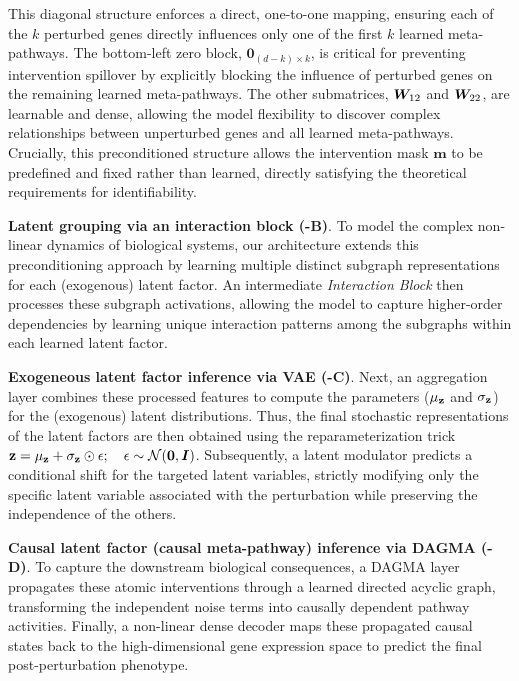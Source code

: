\documentclass[10pt,letterpaper]{article}
\def\vzero{{\bm{0}}}\def\vone{{\bm{1}}}
\def\vm{{\bm{m}}}\def\vn{{\bm{n}}}\def\vo{{\bm{o}}}
\theoremstyle{definition}
\theoremstyle{remark}
\newcommand{\vect}[1]{\mathbf{\MakeLowercase{#1}}}
\newcommand{\latentvars}{\rvz}
\newcommand{\weightmatrix}{\mW}
\newcommand{\identitymatrix}{\mI}
\newcommand{\latentdim}{d}
\newcommand{\numperturbedgenes}{k}
\newcommand{\maskvector}{\vm}
\newcommand{\normaldist}{\gN}
\begin{document}
This diagonal structure enforces a direct, one-to-one mapping, ensuring each of the $\numperturbedgenes$ perturbed genes directly influences only one of the first $\numperturbedgenes$ learned meta-pathways.
The bottom-left zero block, $\vzero_{(\latentdim-\numperturbedgenes) \times \numperturbedgenes}$, is critical for preventing intervention spillover by explicitly blocking the influence of perturbed genes on the remaining learned meta-pathways.
The other submatrices, $\weightmatrix_{12}$ and $\weightmatrix_{22}$, are learnable and dense, allowing the model flexibility to discover complex relationships between unperturbed genes and all learned meta-pathways.
Crucially, this preconditioned structure allows the intervention mask $\maskvector$ to be predefined and fixed rather than learned, directly satisfying the theoretical requirements for identifiability.

\textbf{Latent grouping via an interaction block (-B)}. To model the complex non-linear dynamics of biological systems, our architecture extends this preconditioning approach by learning multiple distinct subgraph representations for each (exogenous) latent factor.
An intermediate \emph{Interaction Block} then processes these subgraph activations, allowing the model to capture higher-order dependencies by learning unique interaction patterns among the subgraphs within each learned latent factor.

\textbf{Exogeneous latent factor inference via VAE (-C)}. Next, an aggregation layer combines these processed features to compute the parameters ($\vect{\mu}_{\latentvars}$ and $\vect{\sigma}_{\latentvars}$) for the (exogenous) latent distributions.
Thus, the final stochastic representations of the latent factors are then obtained using the reparameterization trick $\latentvars = \vect{\mu}_{\latentvars} + \vect{\sigma}_{\latentvars} \odot \vect{\epsilon}; \quad \vect{\epsilon} \sim \normaldist(\vect{0}, \identitymatrix)$.
Subsequently, a latent modulator predicts a conditional shift for the targeted latent variables, strictly modifying only the specific latent variable associated with the perturbation while preserving the independence of the others.

\textbf{Causal latent factor (causal meta-pathway) inference via DAGMA (-D)}. To capture the downstream biological consequences, a DAGMA layer propagates these atomic interventions through a learned directed acyclic graph, transforming the independent noise terms into causally dependent pathway activities.
Finally, a non-linear dense decoder maps these propagated causal states back to the high-dimensional gene expression space to predict the final post-perturbation phenotype.
\end{document}
